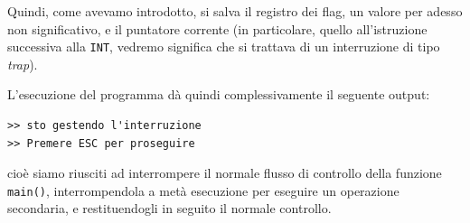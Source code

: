 \documentclass[a4paper,11pt]{article}
\begin{document}
Quindi, come avevamo introdotto, si salva il registro dei flag, un valore per adesso non significativo, e il puntatore corrente (in particolare, quello all'istruzione successiva alla \lstinline|INT|, vedremo significa che si trattava di un interruzione di tipo \textit{trap}).

L'esecuzione del programma dà quindi complessivamente il seguente output:
\begin{lstlisting}[style=shellstyle]
>> sto gestendo l'interruzione                                                                         
>> Premere ESC per proseguire
\end{lstlisting}
cioè siamo riusciti ad interrompere il normale flusso di controllo della funzione \lstinline|main()|, interrompendola a metà esecuzione per eseguire un operazione secondaria, e restituendogli in seguito il normale controllo.
\end{document}

